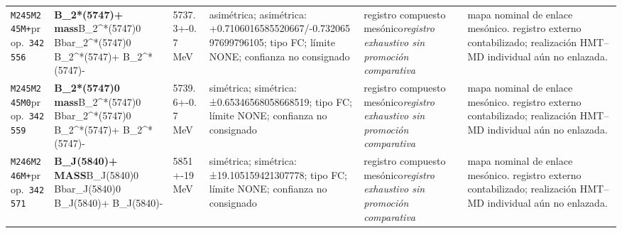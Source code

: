 \begin{landscape}
\begin{longtable}{L{1.85cm}L{4.45cm}L{2.35cm}L{4.05cm}L{3.35cm}L{7.15cm}}
\texttt{M245}\newline \texttt{M245M+}\newline prop.\ \texttt{342556} & \textbf{B\_\allowbreak{}2*(5747)+ mass}\newline B\_\allowbreak{}2\textasciicircum{}*(5747)0 \textbar{}\allowbreak{} Bbar\_\allowbreak{}2\textasciicircum{}*(5747)0 \textbar{}\allowbreak{} B\_\allowbreak{}2\textasciicircum{}*(5747)+ \textbar{}\allowbreak{} B\_\allowbreak{}2\textasciicircum{}*(5747)- & 5737.3+-0.7\,MeV & asimétrica; asimétrica: +0.7106016585520667/-0.73206597699796105; tipo FC; límite NONE; confianza no consignado & registro compuesto mesónico\newline \emph{registro exhaustivo sin promoción comparativa} & mapa nominal de enlace mesónico. registro externo contabilizado; realización HMT--MD individual aún no enlazada. \\
\texttt{M245}\newline \texttt{M245M0}\newline prop.\ \texttt{342559} & \textbf{B\_\allowbreak{}2*(5747)0 mass}\newline B\_\allowbreak{}2\textasciicircum{}*(5747)0 \textbar{}\allowbreak{} Bbar\_\allowbreak{}2\textasciicircum{}*(5747)0 \textbar{}\allowbreak{} B\_\allowbreak{}2\textasciicircum{}*(5747)+ \textbar{}\allowbreak{} B\_\allowbreak{}2\textasciicircum{}*(5747)- & 5739.6+-0.7\,MeV & simétrica; simétrica: ±0.65346568058668519; tipo FC; límite NONE; confianza no consignado & registro compuesto mesónico\newline \emph{registro exhaustivo sin promoción comparativa} & mapa nominal de enlace mesónico. registro externo contabilizado; realización HMT--MD individual aún no enlazada. \\
\texttt{M246}\newline \texttt{M246M+}\newline prop.\ \texttt{342571} & \textbf{B\_\allowbreak{}J(5840)+ MASS}\newline B\_\allowbreak{}J(5840)0 \textbar{}\allowbreak{} Bbar\_\allowbreak{}J(5840)0 \textbar{}\allowbreak{} B\_\allowbreak{}J(5840)+ \textbar{}\allowbreak{} B\_\allowbreak{}J(5840)- & 5851+-19\,MeV & simétrica; simétrica: ±19.105159421307778; tipo FC; límite NONE; confianza no consignado & registro compuesto mesónico\newline \emph{registro exhaustivo sin promoción comparativa} & mapa nominal de enlace mesónico. registro externo contabilizado; realización HMT--MD individual aún no enlazada. \\

\end{longtable}
\end{landscape}

